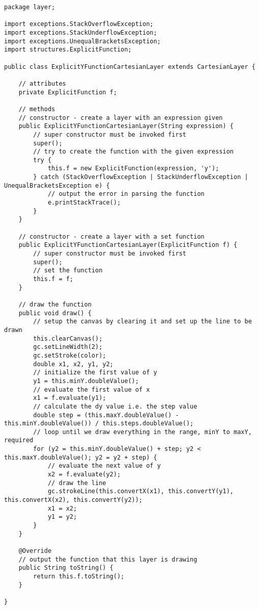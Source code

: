 \documentclass[../../../../main.tex]{subfiles}
\begin{document}
\begin{verbatim}
package layer;

import exceptions.StackOverflowException;
import exceptions.StackUnderflowException;
import exceptions.UnequalBracketsException;
import structures.ExplicitFunction;

public class ExplicitYFunctionCartesianLayer extends CartesianLayer {

	// attributes
	private ExplicitFunction f;

	// methods
	// constructor - create a layer with an expression given
	public ExplicitYFunctionCartesianLayer(String expression) {
		// super constructor must be invoked first
		super();
		// try to create the function with the given expression
		try {
			this.f = new ExplicitFunction(expression, 'y');
		} catch (StackOverflowException | StackUnderflowException | UnequalBracketsException e) {
			// output the error in parsing the function
			e.printStackTrace();
		}
	}

	// constructor - create a layer with a set function
	public ExplicitYFunctionCartesianLayer(ExplicitFunction f) {
		// super constructor must be invoked first
		super();
		// set the function
		this.f = f;
	}

	// draw the function
	public void draw() {
		// setup the canvas by clearing it and set up the line to be drawn
		this.clearCanvas();
		gc.setLineWidth(2);
		gc.setStroke(color);
		double x1, x2, y1, y2;
		// initialize the first value of y
		y1 = this.minY.doubleValue();
		// evaluate the first value of x
		x1 = f.evaluate(y1);
		// calculate the dy value i.e. the step value
		double step = (this.maxY.doubleValue() - this.minY.doubleValue()) / this.steps.doubleValue();
		// loop until we draw everything in the range, minY to maxY, required
		for (y2 = this.minY.doubleValue() + step; y2 < this.maxY.doubleValue(); y2 = y2 + step) {
			// evaluate the next value of y
			x2 = f.evaluate(y2);
			// draw the line
			gc.strokeLine(this.convertX(x1), this.convertY(y1), this.convertX(x2), this.convertY(y2));
			x1 = x2;
			y1 = y2;
		}
	}

	@Override
	// output the function that this layer is drawing
	public String toString() {
		return this.f.toString();
	}

}
\end{verbatim}
\newpage
\end{document}
